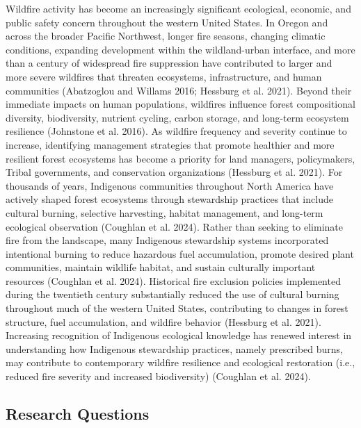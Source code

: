 \documentclass[
  letterpaper,
  DIV=11,
  numbers=noendperiod]{scrartcl}
\begin{document}
Wildfire activity has become an increasingly significant ecological,
economic, and public safety concern throughout the western United
States. In Oregon and across the broader Pacific Northwest, longer fire
seasons, changing climatic conditions, expanding development within the
wildland-urban interface, and more than a century of widespread fire
suppression have contributed to larger and more severe wildfires that
threaten ecosystems, infrastructure, and human communities (Abatzoglou
and Willams 2016; Hessburg et al. 2021). Beyond their immediate impacts
on human populations, wildfires influence forest compositional
diversity, biodiversity, nutrient cycling, carbon storage, and long-term
ecosystem resilience (Johnstone et al. 2016). As wildfire frequency and
severity continue to increase, identifying management strategies that
promote healthier and more resilient forest ecosystems has become a
priority for land managers, policymakers, Tribal governments, and
conservation organizations (Hessburg et al. 2021). \hspace{0pt} For
thousands of years, Indigenous communities throughout North America have
actively shaped forest ecosystems through stewardship practices that
include cultural burning, selective harvesting, habitat management, and
long-term ecological observation (Coughlan et al. 2024). Rather than
seeking to eliminate fire from the landscape, many Indigenous
stewardship systems incorporated intentional burning to reduce hazardous
fuel accumulation, promote desired plant communities, maintain wildlife
habitat, and sustain culturally important resources (Coughlan et al.
2024). Historical fire exclusion policies implemented during the
twentieth century substantially reduced the use of cultural burning
throughout much of the western United States, contributing to changes in
forest structure, fuel accumulation, and wildfire behavior (Hessburg et
al. 2021). Increasing recognition of Indigenous ecological knowledge has
renewed interest in understanding how Indigenous stewardship practices,
namely prescribed burns, may contribute to contemporary wildfire
resilience and ecological restoration (i.e., reduced fire severity and
increased biodiversity) (Coughlan et al. 2024).

\subsection{Research Questions}\label{research-questions}
\end{document}
